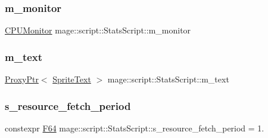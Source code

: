 \hypertarget{classmage_1_1script_1_1_stats_script_ae5b97f07da7adb0740cd68cf2c4abbf5}{}\label{classmage_1_1script_1_1_stats_script_ae5b97f07da7adb0740cd68cf2c4abbf5} 
\subsubsection{\texorpdfstring{m\+\_\+monitor}{m\_monitor}}
{\footnotesize\ttfamily \hyperlink{classmage_1_1_c_p_u_monitor}{C\+P\+U\+Monitor} mage\+::script\+::\+Stats\+Script\+::m\+\_\+monitor\hspace{0.3cm}{\ttfamily [private]}}

\hypertarget{classmage_1_1script_1_1_stats_script_a0257952ca11f30ced1d87ee6a93fd245}{}\label{classmage_1_1script_1_1_stats_script_a0257952ca11f30ced1d87ee6a93fd245} 
\subsubsection{\texorpdfstring{m\+\_\+text}{m\_text}}
{\footnotesize\ttfamily \hyperlink{classmage_1_1_proxy_ptr}{Proxy\+Ptr}$<$ \hyperlink{classmage_1_1_sprite_text}{Sprite\+Text} $>$ mage\+::script\+::\+Stats\+Script\+::m\+\_\+text\hspace{0.3cm}{\ttfamily [private]}}

\hypertarget{classmage_1_1script_1_1_stats_script_adad03ab9bd20bde0709365d43a4158fd}{}\label{classmage_1_1script_1_1_stats_script_adad03ab9bd20bde0709365d43a4158fd} 
\subsubsection{\texorpdfstring{s\+\_\+resource\+\_\+fetch\+\_\+period}{s\_resource\_fetch\_period}}
{\footnotesize\ttfamily constexpr \hyperlink{namespacemage_ad26233bbec640deda836e572c1a23708}{F64} mage\+::script\+::\+Stats\+Script\+::s\+\_\+resource\+\_\+fetch\+\_\+period = 1.\hspace{0.3cm}{\ttfamily [static]}}

